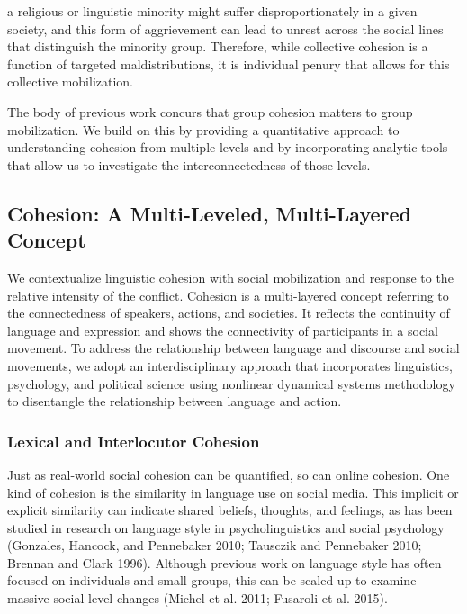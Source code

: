 \documentclass[english,man]{apa6}
\begin{document}
\begin{singlespace}
\setlength{\leftskip}{1cm}

\noindent a religious or linguistic minority
might suffer disproportionately in a given society, and this form of
aggrievement can lead to unrest across the social lines that distinguish the
minority group. Therefore, while collective cohesion is a function of targeted
maldistributions, it is individual penury that allows for this collective
mobilization.

\setlength{\leftskip}{0pt}
\end{singlespace}

The body of previous work concurs that group cohesion matters to group
mobilization. We build on this by providing a quantitative approach to
understanding cohesion from multiple levels and by incorporating analytic tools
that allow us to investigate the interconnectedness of those levels.

\hypertarget{cohesion-a-multi-leveled-multi-layered-concept}{%
\subsection{Cohesion: A Multi-Leveled, Multi-Layered Concept}\label{cohesion-a-multi-leveled-multi-layered-concept}}

We contextualize linguistic cohesion with social mobilization and response to
the relative intensity of the conflict. Cohesion is a multi-layered concept
referring to the connectedness of speakers, actions, and societies. It
reflects the continuity of language and expression and shows the
connectivity of participants in a social movement. To address the relationship
between language and discourse and social movements, we adopt an
interdisciplinary approach that incorporates linguistics, psychology, and
political science using nonlinear dynamical systems methodology to disentangle the
relationship between language and action.

\hypertarget{lexical-and-interlocutor-cohesion}{%
\subsubsection{Lexical and Interlocutor Cohesion}\label{lexical-and-interlocutor-cohesion}}

Just as real-world social cohesion can be quantified, so can online cohesion.
One kind of cohesion is the similarity in language use on social
media. This implicit or explicit similarity can indicate shared
beliefs, thoughts, and feelings, as has been studied in research on language
style in psycholinguistics and social psychology (Gonzales, Hancock, and Pennebaker 2010; Tausczik and Pennebaker 2010; Brennan and Clark 1996). Although previous work on language style has often
focused on individuals and small groups, this can be scaled up to examine
massive social-level changes (Michel et al. 2011; Fusaroli et al. 2015).
\end{document}
